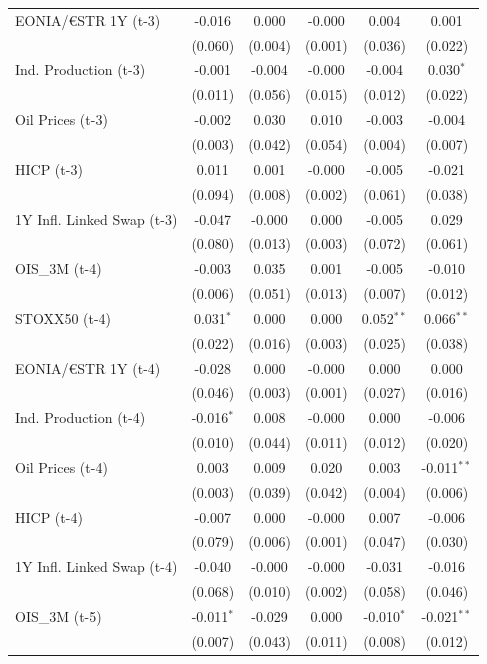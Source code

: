 \begin{longtable}[t]{lccccc}
EONIA/€STR 1Y (t-3) & -0.016 & 0.000 & -0.000 & 0.004 & 0.001\\
 & (0.060) & (0.004) & (0.001) & (0.036) & (0.022)\\
Ind. Production (t-3) & -0.001 & -0.004 & -0.000 & -0.004 & 0.030$^{*}$\\
 & (0.011) & (0.056) & (0.015) & (0.012) & (0.022)\\
Oil Prices (t-3) & -0.002 & 0.030 & 0.010 & -0.003 & -0.004\\
 & (0.003) & (0.042) & (0.054) & (0.004) & (0.007)\\
HICP (t-3) & 0.011 & 0.001 & -0.000 & -0.005 & -0.021\\
 & (0.094) & (0.008) & (0.002) & (0.061) & (0.038)\\
1Y Infl. Linked Swap (t-3) & -0.047 & -0.000 & 0.000 & -0.005 & 0.029\\
 & (0.080) & (0.013) & (0.003) & (0.072) & (0.061)\\
OIS\_3M (t-4) & -0.003 & 0.035 & 0.001 & -0.005 & -0.010\\
 & (0.006) & (0.051) & (0.013) & (0.007) & (0.012)\\
STOXX50 (t-4) & 0.031$^{*}$ & 0.000 & 0.000 & 0.052$^{**}$ & 0.066$^{**}$\\
 & (0.022) & (0.016) & (0.003) & (0.025) & (0.038)\\
EONIA/€STR 1Y (t-4) & -0.028 & 0.000 & -0.000 & 0.000 & 0.000\\
 & (0.046) & (0.003) & (0.001) & (0.027) & (0.016)\\
Ind. Production (t-4) & -0.016$^{*}$ & 0.008 & -0.000 & 0.000 & -0.006\\
 & (0.010) & (0.044) & (0.011) & (0.012) & (0.020)\\
Oil Prices (t-4) & 0.003 & 0.009 & 0.020 & 0.003 & -0.011$^{**}$\\
 & (0.003) & (0.039) & (0.042) & (0.004) & (0.006)\\
HICP (t-4) & -0.007 & 0.000 & -0.000 & 0.007 & -0.006\\
 & (0.079) & (0.006) & (0.001) & (0.047) & (0.030)\\
1Y Infl. Linked Swap (t-4) & -0.040 & -0.000 & -0.000 & -0.031 & -0.016\\
 & (0.068) & (0.010) & (0.002) & (0.058) & (0.046)\\
OIS\_3M (t-5) & -0.011$^{*}$ & -0.029 & 0.000 & -0.010$^{*}$ & -0.021$^{**}$\\
 & (0.007) & (0.043) & (0.011) & (0.008) & (0.012)\\

\end{longtable}
